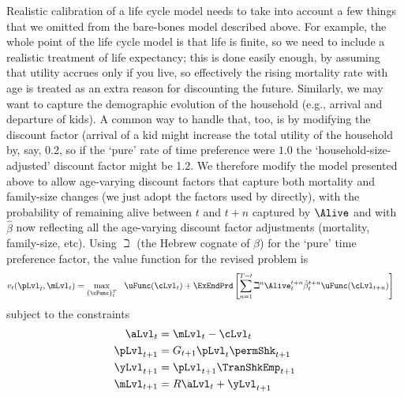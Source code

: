 \documentclass[titlepage, headings=optiontotocandhead]{Resources/texmf-local/tex/latex/econtex}
\begin{document}
Realistic calibration of a life cycle model needs to take into account a few things that we omitted from the bare-bones model described above. For example, the whole point of the life cycle model is that life is finite, so we need to include a realistic treatment of life expectancy; this is done easily enough, by assuming that utility accrues only if you live, so effectively the rising mortality rate with age is treated as an extra reason for discounting the future.  Similarly, we may want to capture the demographic evolution of the household (e.g., arrival and departure of kids).  A common way to handle that, too, is by modifying the discount factor (arrival of a kid might increase the total utility of the household by, say, 0.2, so if the `pure' rate of time preference were $1.0$ the `household-size-adjusted' discount factor might be 1.2.  We therefore modify the model presented above to allow age-varying discount factors that capture both mortality and family-size changes (we just adopt the factors used by \cite{cagettiWprofiles} directly), with the probability of remaining alive between $t$ and $t+n$ captured by $\Alive$ and with $\hat{\beta}$ now reflecting all the age-varying discount factor adjustments (mortality, family-size, etc).  Using $\beth$ (the Hebrew cognate of $\beta$) for the `pure' time preference factor, the value function for the revised problem is
  \begin{equation}\begin{gathered}\begin{aligned}
        v_{t}(\pLvl_{t},\mLvl_{t}) & =    \max_{\{\cFunc\}_{t}^{T}}~~ \uFunc(\cLvl_{t})+\ExEndPrd\left[\sum_{n=1}^{T-t}\beth^{n} \Alive_{t}^{t+n}\hat{\beta}_{t}^{t+n} \uFunc(\cLvl_{t+n}) \right]   \label{eq:lifecyclemax}
      \end{aligned}\end{gathered}  \end{equation}
subject to the constraints
  \begin{equation*}\begin{gathered}\begin{aligned}
        \aLvl_{t}  & = \mLvl_{t}-\cLvl_{t}
        \\      \pLvl_{t+1}  & = G_{t+1}\pLvl_{t}\permShk_{t+1}
        \\      \yLvl_{t+1}  & = \pLvl_{t+1}\TranShkEmp _{t+1}
        \\      \mLvl_{t+1}  & = R \aLvl_{t}+\yLvl_{t+1}
      \end{aligned}\end{gathered}\end{equation*}
\end{document}
